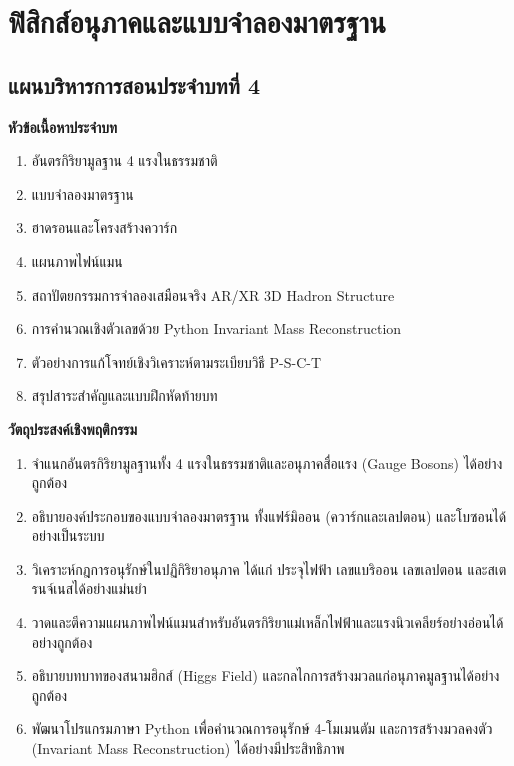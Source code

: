 \chapter{ฟิสิกส์อนุภาคและแบบจำลองมาตรฐาน}
\label{chap:particle_physics}

\section*{แผนบริหารการสอนประจำบทที่ 4}


\begin{lessonplanbox}
\noindent\textbf{หัวข้อเนื้อหาประจำบท}
\begin{enumerate}
    \item อันตรกิริยามูลฐาน 4 แรงในธรรมชาติ
    \item แบบจำลองมาตรฐาน
    \item ฮาดรอนและโครงสร้างควาร์ก
    \item แผนภาพไฟน์แมน
    \item สถาปัตยกรรมการจำลองเสมือนจริง AR/XR 3D Hadron Structure
    \item การคำนวณเชิงตัวเลขด้วย Python Invariant Mass Reconstruction
    \item ตัวอย่างการแก้โจทย์เชิงวิเคราะห์ตามระเบียบวิธี P-S-C-T
    \item สรุปสาระสำคัญและแบบฝึกหัดท้ายบท
\end{enumerate}

\noindent\textbf{วัตถุประสงค์เชิงพฤติกรรม}
\begin{enumerate}
    \item จำแนกอันตรกิริยามูลฐานทั้ง 4 แรงในธรรมชาติและอนุภาคสื่อแรง (Gauge Bosons) ได้อย่างถูกต้อง
    \item อธิบายองค์ประกอบของแบบจำลองมาตรฐาน ทั้งแฟร์มิออน (ควาร์กและเลปตอน) และโบซอนได้อย่างเป็นระบบ
    \item วิเคราะห์กฎการอนุรักษ์ในปฏิกิริยาอนุภาค ได้แก่ ประจุไฟฟ้า เลขแบริออน เลขเลปตอน และสเตรนจ์เนสได้อย่างแม่นยำ
    \item วาดและตีความแผนภาพไฟน์แมนสำหรับอันตรกิริยาแม่เหล็กไฟฟ้าและแรงนิวเคลียร์อย่างอ่อนได้อย่างถูกต้อง
    \item อธิบายบทบาทของสนามฮิกส์ (Higgs Field) และกลไกการสร้างมวลแก่อนุภาคมูลฐานได้อย่างถูกต้อง
    \item พัฒนาโปรแกรมภาษา Python เพื่อคำนวณการอนุรักษ์ 4-โมเมนตัม และการสร้างมวลคงตัว (Invariant Mass Reconstruction) ได้อย่างมีประสิทธิภาพ
\end{enumerate}


\end{lessonplanbox}
